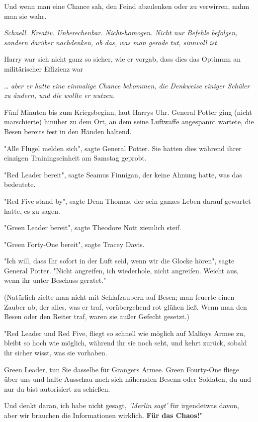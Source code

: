 {Und wenn man eine Chance sah, den Feind abzulenken oder zu verwirren, nahm man sie wahr.

\emph{Schnell. Kreativ. Unberechenbar. Nicht-homogen. Nicht nur Befehle befolgen, sondern darüber nachdenken, ob das, was man gerade tut, sinnvoll ist.}

Harry war sich nicht ganz so sicher, wie er vorgab, dass dies das Optimum an militärischer Effizienz war

… \emph{aber er hatte eine einmalige Chance bekommen, die Denkweise einiger Schüler zu ändern, und die wollte er nutzen.}

Fünf Minuten bis zum Kriegsbeginn, laut Harrys Uhr. General Potter ging (nicht marschierte) hinüber zu dem Ort, an dem seine Luftwaffe angespannt wartete, die Besen bereits fest in den Händen haltend.

"Alle Flügel melden sich", sagte General Potter. Sie hatten dies während ihrer einzigen Trainingseinheit am Samstag geprobt.

"Red Leader bereit", sagte Seamus Finnigan, der keine Ahnung hatte, was das bedeutete.

"Red Five stand by", sagte Dean Thomas, der sein ganzes Leben darauf gewartet hatte, es zu sagen.

"Green Leader bereit", sagte Theodore Nott ziemlich steif.

"Green Forty-One bereit", sagte Tracey Davis.

"Ich will, dass Ihr sofort in der Luft seid, wenn wir die Glocke hören", sagte General Potter. "Nicht angreifen, ich wiederhole, nicht angreifen. Weicht aus, wenn ihr unter Beschuss geratet."

(Natürlich zielte man nicht mit Schlafzaubern auf Besen; man feuerte einen Zauber ab, der alles, was er traf, vorübergehend rot glühen ließ. Wenn man den Besen oder den Reiter traf, waren sie außer Gefecht gesetzt.)

"Red Leader und Red Five, fliegt so schnell wie möglich auf Malfoys Armee zu, bleibt so hoch wie möglich, während ihr sie noch seht, und kehrt zurück, sobald ihr sicher wisst, was sie vorhaben.

Green Leader, tun Sie dasselbe für Grangers Armee. Green Fourty-One fliege über uns und halte Ausschau nach sich nähernden Besenn oder Soldaten, du und nur du bist autorisiert zu schießen.

Und denkt daran, ich habe nicht gesagt, \emph{'Merlin sagt'} für irgendetwas davon, aber wir brauchen die Informationen wirklich. \textbf{Für das Chaos!}"

}

